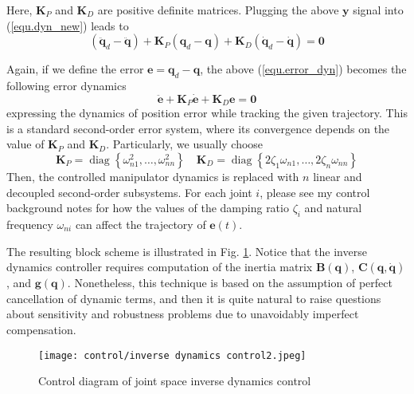 \documentclass[10pt]{article}
\begin{document}
Here,  $\boldsymbol{K}_{P}$ and $\boldsymbol{K}_{D}$ are positive definite matrices.
Plugging the above $\boldsymbol{y}$ signal into (\ref{equ.dyn_new}) leads to
\begin{equation}\label{equ.error_dyn}
    (\ddot{\boldsymbol{{q}}}_d-\ddot{\boldsymbol{q}})+\boldsymbol{K}_{P} ({\boldsymbol{q}}_{d}-\boldsymbol{q})+\boldsymbol{K}_{D} (\dot{\boldsymbol{q}}_{d}-\dot{\boldsymbol{q}})=\boldsymbol{0}
\end{equation}

Again, if we define the error $\boldsymbol{e}={\boldsymbol{q}}_{d}-{\boldsymbol{q}}$, the above (\ref{equ.error_dyn}) becomes the following error dynamics
\begin{equation}\label{equ.error_dyn}
    \ddot{\boldsymbol{e}}+\boldsymbol{K}_{P} \dot{\boldsymbol{e}}+\boldsymbol{K}_{D} {\boldsymbol{e}}=\boldsymbol{0}
\end{equation}
expressing the dynamics of position error  while tracking the given trajectory. This is a standard second-order error system, where its convergence depends on the value of $\boldsymbol{K}_P$ and $\boldsymbol{K}_D$. 
Particularly, we usually choose 
\begin{equation}\label{equ.kpkd}
    \boldsymbol{K}_{P}=\operatorname{diag}\left\{\omega_{n 1}^{2}, \ldots, \omega_{n n}^{2}\right\} \quad \boldsymbol{K}_{D}=\operatorname{diag}\left\{2 \zeta_{1} \omega_{n 1}, \ldots, 2 \zeta_{n} \omega_{n n}\right\}
\end{equation}
Then, the controlled manipulator dynamics is replaced with $n$ linear and decoupled second-order subsystems. For each joint $i$, please see my control background notes for how the values of the damping ratio $\zeta_i$ and natural frequency $\omega_{ni}$ can affect the trajectory of $\boldsymbol{e}(t)$. 








The resulting block scheme is illustrated in Fig. \ref{fig:3}. Notice that the inverse dynamics controller requires computation of the inertia matrix $\boldsymbol{B}(\boldsymbol{q})$, $\boldsymbol{C}(\boldsymbol{q}, \dot{\boldsymbol{q}})$, and $\boldsymbol{g}(\boldsymbol{q})$.  
 Nonetheless, this technique is based on the assumption of perfect cancellation of dynamic terms, and then it is quite natural to raise questions about sensitivity and robustness problems due to unavoidably imperfect compensation.




\begin{figure}[H]
    \centering
    \texttt{[image: control/inverse dynamics control2.jpeg]}
    \caption{Control diagram of joint space inverse dynamics control}
    \label{fig:3}
\end{figure}
\end{document}

